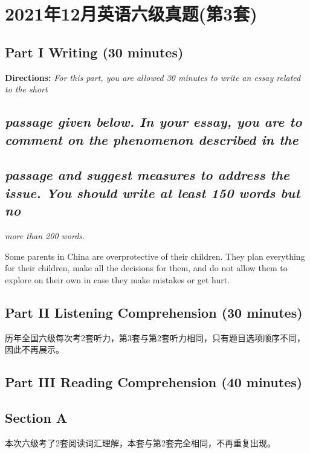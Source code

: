 \documentclass[UTF8,11pt]{ctexart}
\begin{document}
\section*{2021年12月英语六级真题(第3套)}
\subsection*{\textbf{Part }I \textbf{Writing} \textbf{(30 minutes)}}


\textbf{Directions: }\textit{For this part, you are allowed 30 minutes to write an essay related to the short}


\subsection*{\textit{passage given below. In your essay, you are to comment on the phenomenon described in the}}


\subsection*{\textit{passage and suggest measures to address the issue. You should write at least 150 words but no}}


\textit{more than 200 words.}


Some parents in China are overprotective of their children. They plan everything for their children, make all the decisions for them, and do not allow them to explore on their own in case they make mistakes or get hurt.


\subsection*{\textbf{Part }II \textbf{Listening Comprehension} \textbf{(30 minutes)}}


历年全国六级每次考2套听力，第3套与第2套听力相同，只有题目选项顺序不同，因此不再展示。


\subsection*{\textbf{Part }III \textbf{Reading Comprehension} \textbf{(40 minutes)}}


\subsection*{\textbf{Section A}}


本次六级考了2套阅读词汇理解，本套与第2套完全相同，不再重复出现。
\end{document}
